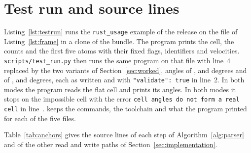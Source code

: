 \documentclass[preprint,12pt]{elsarticle}
\begin{document}
\FloatBarrier \section{Test run and source lines}\label{sec:supp-testrun} Listing~\ref{lst:testrun} runs the \texttt{rust\_usage} example of the release on the file of Listing~\ref{lst:frame} in a clone of the bundle.
The program prints the cell, the counts and the first five atoms with their fixed flags, identifiers and velocities.
\texttt{scripts/\allowbreak test\_run.py} then runs the same program on that file with line~4 replaced by the two variants of Section~\ref{sec:worked}, angles of \wkFlatAlpha, \wkFlatBeta{} and \wkFlatGamma{} degrees and of \wkNoneAlpha, \wkNoneAlpha{} and \wkNoneGamma{} degrees, each as written and with \texttt{"validate": true} in line~2.
In both modes the program reads the flat cell and prints its angles.
In both modes it stops on the impossible cell with the error \texttt{cell angles do not form a real cell} in line~\trCellLine.
 keeps the commands, the toolchain and what the program printed for each of the five files.



Table~\ref{tab:anchors} gives the source lines of each step of Algorithm~\ref{alg:parser} and of the other read and write paths of Section~\ref{sec:implementation}.
\end{document}
